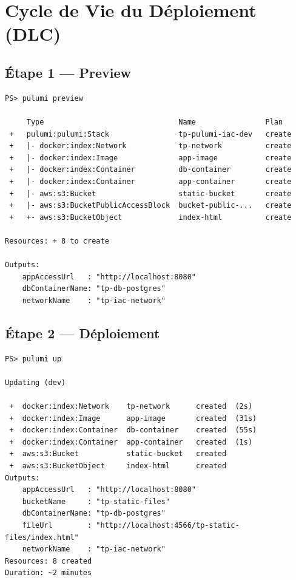 \documentclass[12pt,a4paper]{article}
\begin{document}
\section{\textcolor{pulumiBlue}{Cycle de Vie du Déploiement (DLC)}}

\subsection{Étape 1 --- Preview}

\begin{lstlisting}[style=termStyle, caption=pulumi preview]
PS> pulumi preview

     Type                               Name                Plan
 +   pulumi:pulumi:Stack                tp-pulumi-iac-dev   create
 +   |- docker:index:Network            tp-network          create
 +   |- docker:index:Image              app-image           create
 +   |- docker:index:Container          db-container        create
 +   |- docker:index:Container          app-container       create
 +   |- aws:s3:Bucket                   static-bucket       create
 +   |- aws:s3:BucketPublicAccessBlock  bucket-public-...   create
 +   +- aws:s3:BucketObject             index-html          create

Resources: + 8 to create

Outputs:
    appAccessUrl   : "http://localhost:8080"
    dbContainerName: "tp-db-postgres"
    networkName    : "tp-iac-network"
\end{lstlisting}

\subsection{Étape 2 --- Déploiement}

\begin{lstlisting}[style=termStyle, caption=pulumi up]
PS> pulumi up

Updating (dev)

 +  docker:index:Network    tp-network      created  (2s)
 +  docker:index:Image      app-image       created  (31s)
 +  docker:index:Container  db-container    created  (55s)
 +  docker:index:Container  app-container   created  (1s)
 +  aws:s3:Bucket           static-bucket   created
 +  aws:s3:BucketObject     index-html      created
Outputs:
    appAccessUrl   : "http://localhost:8080"
    bucketName     : "tp-static-files"
    dbContainerName: "tp-db-postgres"
    fileUrl        : "http://localhost:4566/tp-static-files/index.html"
    networkName    : "tp-iac-network"
Resources: 8 created
Duration: ~2 minutes
\end{lstlisting}
\end{document}
